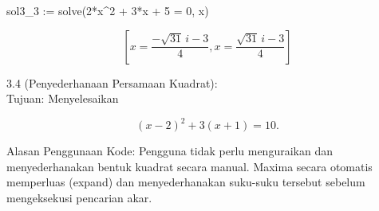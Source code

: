 \documentclass[a4paper,10pt]{article}
\begin{document}
\begin{eulernotebook}
\begin{eulercomment}
\end{eulercomment}
\begin{eulerprompt}
>$&
\end{eulerprompt}
\begin{euleroutput}
  sol3_3 := solve(2*x^2 + 3*x + 5 = 0, x) 
\end{euleroutput}
\begin{eulerformula}
\[
\left[ x=\frac{-\sqrt{31}\,i-3}{4} , x=\frac{\sqrt{31}\,i-3}{4}   \right] 
\]
\end{eulerformula}
\begin{eulercomment}
3.4 (Penyederhanaan Persamaan Kuadrat):\\
Tujuan: Menyelesaikan \\
\end{eulercomment}
\begin{eulerformula}
\[
(x - 2)^2 + 3(x + 1) = 10.
\]
\end{eulerformula}
\begin{eulercomment}
Alasan Penggunaan Kode: Pengguna tidak perlu menguraikan dan
menyederhanakan bentuk kuadrat secara manual. Maxima secara otomatis
memperluas (expand) dan menyederhanakan suku-suku tersebut sebelum
mengeksekusi pencarian akar.


\end{eulercomment}
\end{eulernotebook}
\end{document}
